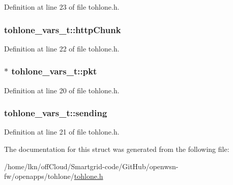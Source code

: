 Definition at line 23 of file tohlone.\+h.

\subsubsection[{\texorpdfstring{http\+Chunk}{httpChunk}}]{ tohlone\+\_\+vars\+\_\+t\+::http\+Chunk}\hypertarget{structtohlone__vars__t_a37937ca3f79901a363a85d812f2e6443}{}\label{structtohlone__vars__t_a37937ca3f79901a363a85d812f2e6443}


Definition at line 22 of file tohlone.\+h.

\subsubsection[{\texorpdfstring{pkt}{pkt}}]{$\ast$ tohlone\+\_\+vars\+\_\+t\+::pkt}\hypertarget{structtohlone__vars__t_a0457aaa5b4ea14a49fbc37052f159a35}{}\label{structtohlone__vars__t_a0457aaa5b4ea14a49fbc37052f159a35}


Definition at line 20 of file tohlone.\+h.

\subsubsection[{\texorpdfstring{sending}{sending}}]{ tohlone\+\_\+vars\+\_\+t\+::sending}\hypertarget{structtohlone__vars__t_a25e888d77b871a5516b8758d9a6ac751}{}\label{structtohlone__vars__t_a25e888d77b871a5516b8758d9a6ac751}


Definition at line 21 of file tohlone.\+h.



The documentation for this struct was generated from the following file\+:\begin{DoxyCompactItemize}
\item 
/home/lkn/off\+Cloud/\+Smartgrid-\/code/\+Git\+Hub/openwsn-\/fw/openapps/tohlone/\hyperlink{tohlone_8h}{tohlone.\+h}\end{DoxyCompactItemize}

